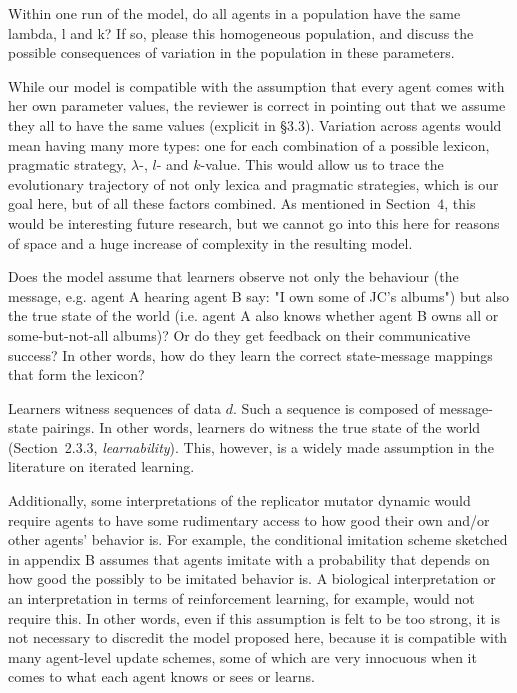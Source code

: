 \documentclass[12pt,a4paper]{article}
\begin{document}
\vspace{.5cm}
  \begin{mdframed}[backgroundcolor=gray!25,linecolor=gray!25]
Within one run of the model, do all agents in a population have the same lambda, l and k? If so, please this homogeneous population, and discuss the possible consequences of variation in the population in these parameters.
\end{mdframed}
While our model is compatible with the assumption that every agent comes with her own parameter
values, the reviewer is correct in pointing out that we assume they all to have the same values
(explicit in \S3.3). Variation across agents would mean having many more types: one for each
combination of a possible lexicon, pragmatic strategy, $\lambda$-, $l$- and $k$-value. This
would allow us to trace the evolutionary trajectory of not only lexica and pragmatic
strategies, which is our goal here, but of all these factors combined. As mentioned in
Section~$4$, this would be interesting future research, but we cannot go into this here for
reasons of space and a huge increase of complexity in the resulting model. 

\vspace{.5cm}
\begin{mdframed}[backgroundcolor=gray!25,linecolor=gray!25]
Does the model assume that learners observe not only the behaviour (the message, e.g. agent A hearing agent B say: "I own some of JC's albums") but also the true state of the world (i.e. agent A also knows whether agent B owns all or some-but-not-all albums)? Or do they get feedback on their communicative success? In other words, how do they learn the correct state-message mappings that form the lexicon? 
\end{mdframed}
Learners witness sequences of data $d$. Such a sequence is composed of message-state
pairings. In other words, learners do witness the true state of the world (Section~2.3.3, {\em
  learnability}). This, however, is a widely made assumption in the literature on iterated
learning. 

Additionally, some interpretations of the replicator mutator dynamic would require agents to
have some rudimentary access to how good their own and/or other agents' behavior is. For
example, the conditional imitation scheme sketched in appendix B assumes that agents imitate
with a probability that depends on how good the possibly to be imitated behavior is. A
biological interpretation or an interpretation in terms of reinforcement learning, for example,
would not require this. In other words, even if this assumption is felt to be too strong, it is
not necessary to discredit the model proposed here, because it is compatible with many
agent-level update schemes, some of which are very innocuous when it comes to what each agent
knows or sees or learns.
\end{document}
